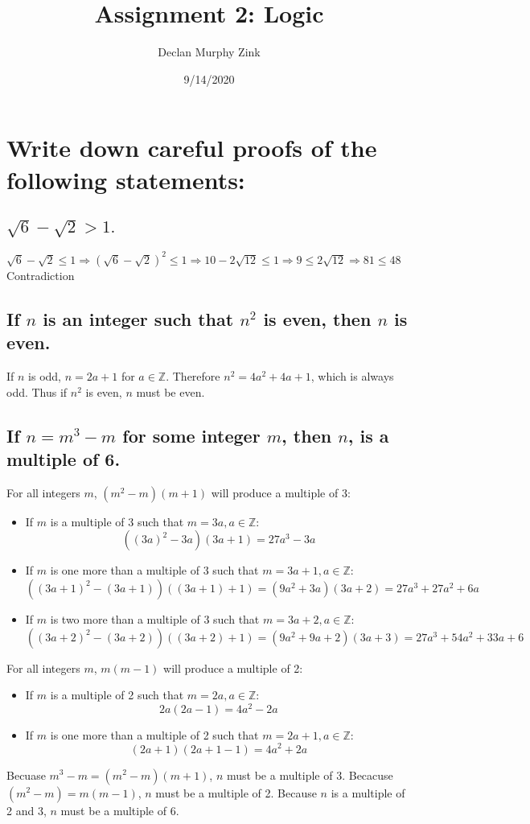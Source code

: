 \documentclass[12pt]{article}
\begin{document}
\title{Assignment 2: Logic}
\author{Declan Murphy Zink}
\date{9/14/2020}
\maketitle

\setcounter{section}{5}
\section{Write down careful proofs of the following statements:}
\subsection{$\sqrt{6}-\sqrt{2}>1.$}
$\sqrt{6}-\sqrt{2} \leq 1 \Rightarrow (\sqrt{6}-\sqrt{2})^2 \leq 1 \Rightarrow
10 - 2 \sqrt{12} \leq 1 \Rightarrow 9 \leq 2 \sqrt{12} \Rightarrow 81 \leq 48$\\
Contradiction

\subsection{If $n$ is an integer such that  $n^2$ is even, then $n$ is even.}
If $n$ is odd, $n = 2a + 1$ for $a \in \mathds{Z}$. Therefore $n^2 = 4a^2 + 4a + 1$, which is always odd.
Thus if $n^2$ is even, $n$ must be even.

\subsection{If $n = m^3 - m$ for some integer $m$, then $n$, is a multiple of 6.}
For all integers $m$, $(m^2-m)(m+1)$ will produce a multiple of 3:
\begin{itemize}
    \item If $m$ is a multiple of 3 such that $m = 3a, a \in \mathds{Z}$:
    $$((3a)^2-3a)(3a+1) = 27a^3-3a$$
    \item If $m$ is one more than a multiple of 3 such that $m = 3a+1, a \in \mathds{Z}$:
    $$((3a+1)^2-(3a+1))((3a+1)+1) = (9a^2+3a)(3a+2) = 27a^3 + 27a^2 + 6a$$
    \item If $m$ is two more than a multiple of 3 such that $m = 3a+2, a \in \mathds{Z}$:
    $$((3a+2)^2-(3a+2))((3a+2)+1) = (9a^2+9a+2)(3a+3) = 27a^3 + 54a^2 + 33a + 6$$
\end{itemize}
For all integers $m$, $m(m-1)$ will produce a multiple of 2:
\begin{itemize}
    \item If $m$ is a multiple of 2 such that $m = 2a, a \in \mathds{Z}$:
    $$2a(2a-1) = 4a^2 - 2a$$
    \item If $m$ is one more than a multiple of 2 such that $m = 2a + 1, a \in \mathds{Z}$:
    $$(2a+1)(2a+1-1) = 4a^2 + 2a$$
\end{itemize}
Becuase $m^3 - m = (m^2-m)(m+1)$, $n$ must be a multiple of 3. Becacuse $(m^2-m) = m(m-1)$, $n$ must be a multiple of 2.
Because $n$ is a multiple of 2 and 3, $n$ must be a multiple of 6.
\end{document}

